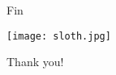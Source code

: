 \documentclass[xcolor=pdftex,t,11pt]{beamer}
\begin{document}
\begin{frame}[fragile]{Fin}

\begin{center}
\texttt{[image: sloth.jpg]}

\Huge
 Thank you!
\end{center}

\end{frame}
\end{document}
